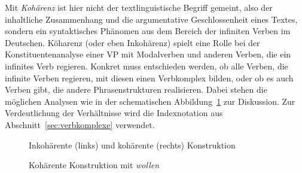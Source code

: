 \label{sec:kohaerenz}


Mit \textit{Kohärenz} ist hier nicht der textlinguistische Begriff gemeint, also der inhaltliche Zusammenhang und die argumentative Geschlossenheit eines Textes, sondern ein syntaktisches Phänomen aus dem Bereich der infiniten Verben im Deutschen.
Köharenz (oder eben Inkohärenz) spielt eine Rolle bei der Konstituentenanalyse einer VP mit Modalverben und anderen Verben, die ein infinites Verb regieren.
Konkret muss entschieden werden, ob alle Verben, die infinite Verben regieren, mit diesen einen Verbkomplex bilden, oder ob es auch Verben gibt, die andere Phrasenstrukturen realisieren.
Dabei stehen die möglichen Analysen wie in der schematischen Abbildung~\ref{fig:hypkohinkoh} zur Diskussion.
Zur Verdeutlichung der Verhältnisse wird die Indexnotation aus Abschnitt~\ref{sec:verbkomplexe} verwendet.

\begin{figure}[!htbp]
  \hspace{1cm}
  \vspace{0.5cm}
  \caption[Inkohärente und kohärente Konstruktion]{Inkohärente (links) und kohärente (rechts) Konstruktion}
  \label{fig:hypkohinkoh}
\end{figure}

\begin{figure}[!htbp]
  \caption{Kohärente Konstruktion mit \textit{wollen}}
  \label{fig:hypkoh}
\end{figure}

